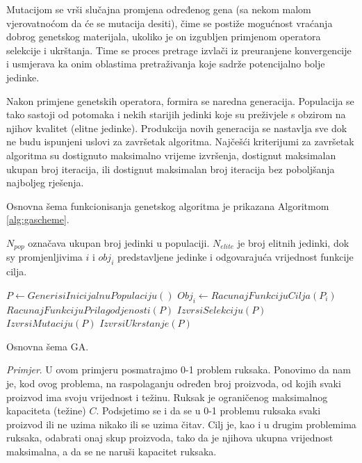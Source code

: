 \documentclass[a4paper, utf8, 11pt, colorlinks]{book}
\begin{document}
Mutacijom se vrši slučajna promjena određenog gena (sa nekom malom vjerovatnoćom da će se mutacija desiti), čime se postiže mogućnost vraćanja dobrog genetskog materijala, ukoliko je on izgubljen primjenom operatora selekcije i ukrštanja. Time se proces pretrage izvlači iz preuranjene konvergencije i usmjerava ka onim oblastima pretraživanja koje sadrže potencijalno bolje jedinke.


Nakon primjene genetskih operatora, formira se naredna generacija. Populacija se tako sastoji od potomaka i nekih starijih jedinki koje su preživjele s obzirom na njihov kvalitet (elitne jedinke). Produkcija novih generacija se nastavlja sve dok ne budu ispunjeni uslovi za završetak algoritma. Najčešći kriterijumi za završetak algoritma su dostignuto maksimalno vrijeme izvršenja, dostignut  maksimalan ukupan broj iteracija, ili dostignut maksimalan broj iteracija bez poboljšanja najboljeg rješenja.

Osnovna šema funkcionisanja genetskog algoritma je prikazana Algoritmom \ref{alg:gascheme}.

$N_{pop}$ označava ukupan broj jedinki u populaciji.  $N_{elite}$ je broj elitnih jedinki, dok sy promjenljivima  $i$ i $obj_{i}$ predstavljene jedinke i odgovarajuća vrijednost funkcije cilja.

\begin{algorithm}
	\begin{algorithmic}[1]
		 \STATE  $ P \gets GenerisiInicijalnuPopulaciju()$
		            \STATE $Obj_i \gets RacunajFunkcijuCilja(P_i)$
		       \ENDFOR
		       \STATE $RacunajFunkcijuPrilagodjenosti(P)$
		       \STATE $IzvrsiSelekciju(P)$
		       \STATE $IzvrsiMutaciju(P)$
		       \STATE $IzvrsiUkrstanje(P)$
		 \ENDWHILE
	\end{algorithmic}
    \caption{Osnovna šema GA.}
    \label{alg:gascheme}
\end{algorithm}



\emph{Primjer}. U ovom primjeru posmatrajmo 0-1 problem ruksaka. Ponovimo da nam je, kod ovog problema, na raspolaganju određen broj proizvoda, od kojih svaki proizvod ima svoju vrijednost i težinu. Ruksak je ograničenog maksimalnog kapaciteta (težine) $C$. Podsjetimo se i da se u 0-1 problemu ruksaka svaki proizvod ili ne uzima nikako ili se uzima čitav. Cilj je, kao i u drugim problemima ruksaka, odabrati onaj skup proizvoda, tako da je njihova ukupna vrijednost maksimalna, a da se ne naruši kapacitet ruksaka.
\end{document}
